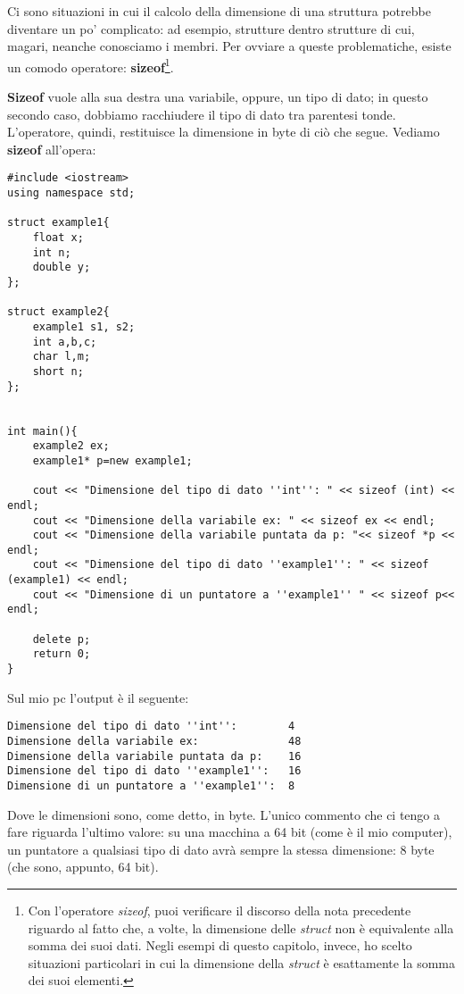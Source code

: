 Ci sono situazioni in cui il calcolo della dimensione di una struttura potrebbe diventare un po' complicato: ad esempio, strutture dentro strutture di cui, magari, neanche conosciamo i membri. Per ovviare a queste problematiche, esiste un comodo operatore: \textbf{sizeof}\footnote{Con l'operatore \emph{sizeof}, puoi verificare il discorso della nota precedente riguardo al fatto che, a volte, la dimensione delle \emph{struct} non è equivalente alla somma dei suoi dati. Negli esempi di questo capitolo, invece, ho scelto situazioni particolari in cui la dimensione della \emph{struct} è esattamente la somma dei suoi elementi.}.

\textbf{Sizeof} vuole alla sua destra una variabile, oppure, un tipo di dato; in questo secondo caso, dobbiamo racchiudere il tipo di dato tra parentesi tonde. L'operatore, quindi, restituisce la dimensione in byte di ciò che segue.
 Vediamo \textbf{sizeof} all'opera:

\begin{lstlisting}
#include <iostream>
using namespace std;

struct example1{
	float x;
	int n;
	double y;
};

struct example2{
	example1 s1, s2;
	int a,b,c;
	char l,m;
	short n;
};


int main(){
	example2 ex;
	example1* p=new example1;
	
	cout << "Dimensione del tipo di dato ''int'': " << sizeof (int) << endl;
	cout << "Dimensione della variabile ex: " << sizeof ex << endl;
	cout << "Dimensione della variabile puntata da p: "<< sizeof *p << endl;
	cout << "Dimensione del tipo di dato ''example1'': " << sizeof (example1) << endl;
	cout << "Dimensione di un puntatore a ''example1'' " << sizeof p<< endl;
	
	delete p;
	return 0;
}
\end{lstlisting}

Sul mio pc l'output è il seguente:
\begin{shaded}
\begin{verbatim}
Dimensione del tipo di dato ''int'':        4
Dimensione della variabile ex:              48
Dimensione della variabile puntata da p:    16
Dimensione del tipo di dato ''example1'':   16
Dimensione di un puntatore a ''example1'':  8
\end{verbatim}
\end{shaded}

Dove le dimensioni sono, come detto, in byte. L'unico commento che ci tengo a fare riguarda l'ultimo valore: su una macchina a 64 bit (come è il mio computer), un puntatore a qualsiasi tipo di dato avrà sempre la stessa dimensione: 8 byte (che sono, appunto, 64 bit).\\

